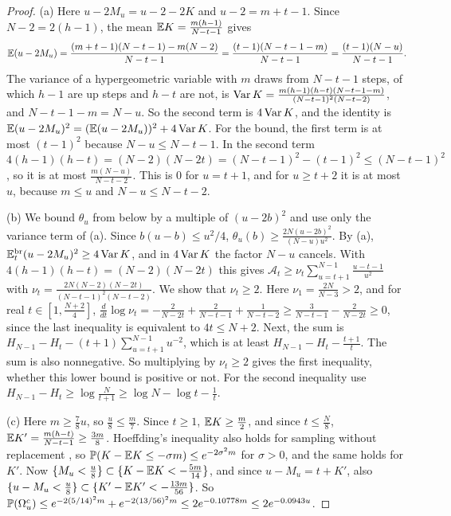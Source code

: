 \begin{proof}
(a) Here $u-2M_u=u-2-2K$ and $u-2=m+t-1$. Since $N-2=2(h-1)$, the mean
$\mathbb{E} K=\frac{m(h-1)}{N-t-1}$ gives
\[
 \mathbb{E}(u-2M_u)=\frac{(m+t-1)(N-t-1)-m(N-2)}{N-t-1}
 =\frac{(t-1)(N-t-1-m)}{N-t-1}=\frac{(t-1)(N-u)}{N-t-1}.
\]
The variance of a hypergeometric variable with $m$ draws from $N-t-1$ steps,
of which $h-1$ are up steps and $h-t$ are not, is
$\operatorname{Var} K=\frac{m(h-1)(h-t)(N-t-1-m)}{(N-t-1)^2(N-t-2)}$, and $N-t-1-m=N-u$. So
the second term is $4\operatorname{Var} K$, and the identity is
$\mathbb{E}(u-2M_u)^2=(\mathbb{E}(u-2M_u))^2+4\operatorname{Var} K$. For the bound, the first term is at
most $(t-1)^2$ because $N-u\le N-t-1$. In the second term
$4(h-1)(h-t)=(N-2)(N-2t)=(N-t-1)^2-(t-1)^2\le(N-t-1)^2$, so it is at most
$\frac{m(N-u)}{N-t-2}$. This is $0$ for $u=t+1$, and for $u\ge t+2$ it is at
most $u$, because $m\le u$ and $N-u\le N-t-2$.

(b) We bound $\theta_u$ from below by a multiple of $(u-2b)^2$ and use only
the variance term of (a). Since $b(u-b)\le u^2/4$,
$\theta_u(b)\ge\frac{2N(u-2b)^2}{(N-u)u^2}$. By (a),
$\mathbb{E}^{\mathrm{br}}_t(u-2M_u)^2\ge4\operatorname{Var} K$, and in $4\operatorname{Var} K$ the factor $N-u$
cancels. With $4(h-1)(h-t)=(N-2)(N-2t)$ this gives
$\mathcal A_t\ge\nu_t\sum_{u=t+1}^{N-1}\frac{u-t-1}{u^2}$ with
$\nu_t=\frac{2N(N-2)(N-2t)}{(N-t-1)^2(N-t-2)}$. We show that $\nu_t\ge2$. Here
$\nu_1=\frac{2N}{N-3}>2$, and for real $t\in[1,\frac{N+2}4]$,
$\frac{d}{dt}\log\nu_t=-\frac2{N-2t}+\frac2{N-t-1}+\frac1{N-t-2}
\ge\frac3{N-t-1}-\frac2{N-2t}\ge0$,
since the last inequality is equivalent to $4t\le N+2$. Next, the sum is
$H_{N-1}-H_t-(t+1)\sum_{u=t+1}^{N-1}u^{-2}$, which is at least
$H_{N-1}-H_t-\frac{t+1}t$. The sum is also nonnegative. So multiplying by
$\nu_t\ge2$ gives the first inequality, whether this lower bound is positive
or not. For the second inequality use
$H_{N-1}-H_t\ge\log\frac N{t+1}\ge\log N-\log t-\frac1t$.

(c) Here $m\ge\frac78u$, so $\frac u8\le\frac m7$. Since $t\ge1$,
$\mathbb{E} K\ge\frac m2$, and since $t\le\frac N8$,
$\mathbb{E} K'=\frac{m(h-t)}{N-t-1}\ge\frac{3m}8$. Hoeffding's inequality also holds
for sampling without replacement \cite[Section~6]{hoeffding1963}, so
$\mathbb{P}(K-\mathbb{E} K\le-\sigma m)\le e^{-2\sigma^2m}$ for $\sigma>0$, and the same
holds for $K'$. Now $\{M_u<\frac u8\}\subset\{K-\mathbb{E} K<-\frac{5m}{14}\}$, and
since $u-M_u=t+K'$, also
$\{u-M_u<\frac u8\}\subset\{K'-\mathbb{E} K'<-\frac{13m}{56}\}$. So
$\mathbb{P}(\Omega_u^c)\le e^{-2(5/14)^2m}+e^{-2(13/56)^2m}\le2e^{-0.10778m}
\le2e^{-0.0943u}$.


\end{proof}
